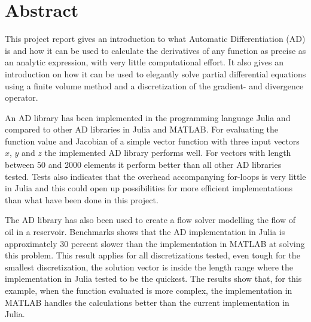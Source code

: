 \chapter*{Abstract}
This project report gives an introduction to what Automatic Differentiation (AD) is and how it can be used to calculate the derivatives of any function as precise as an analytic expression, with very little computational effort. It also gives an introduction on how it can be used to elegantly solve partial differential equations using a finite volume method and a discretization of the gradient- and divergence operator. 

An AD library has been implemented in the programming language Julia and compared to other AD libraries in Julia and MATLAB. For evaluating the function value and Jacobian of a simple vector function with three input vectors $x$, $y$ and $z$ the implemented AD library performs well. For vectors with length between 50 and 2000 elements it perform better than all other AD libraries tested. Tests also indicates that the overhead accompanying for-loops is very little in Julia and this could open up possibilities for more efficient implementations than what have been done in this project.

The AD library has also been used to create a flow solver modelling the flow of oil in a reservoir. Benchmarks shows that the AD implementation in Julia is approximately 30 percent slower than the implementation in MATLAB at solving this problem. This result applies for all discretizations tested, even tough for the smallest discretization, the solution vector is inside the length range where the implementation in Julia tested to be the quickest. The results show that, for this example, when the function evaluated is more complex, the implementation in MATLAB handles the calculations better than the current implementation in Julia. 